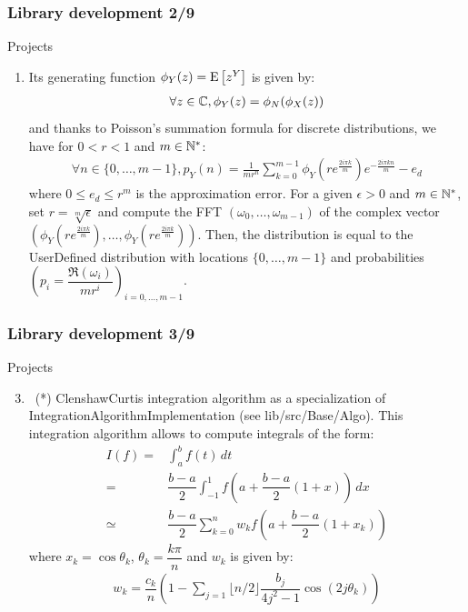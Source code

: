 \documentclass[8pt]{beamer}
\begin{document}
\begin{frame}
  \frametitle{Library development 2/9}
  \begin{block}{Projects}
    \begin{enumerate}
    \item[] Its generating function $\phi_Y(z)={\rm E}\left[ z^Y \right]$ is given by:
      \begin{align}
        \forall z\in{\mathbb C}, \phi_Y(z)=\phi_N(\phi_X(z))
      \end{align}
      and thanks to Poisson's summation formula for discrete distributions, we have for $0<r<1$ and $m\in{\mathbb N}^*$:
      \begin{eqnarray}\label{pnApprox}
        \forall n\in\{0,\dots, m-1\}, p_Y(n) = \displaystyle \frac{1}{mr^n} \sum_{k=0}^{m-1} \phi_Y\left(re^{\frac{2i\pi k}{m}}\right) e^{-\frac{2i\pi kn}{m}} - e_d
      \end{eqnarray}
      where $0\leq e_d\leq r^m$ is the approximation error. For a given $\epsilon>0$ and $m\in{\mathbb N}^*$, set $r=\sqrt[m]{\epsilon}$ and compute the FFT $(\omega_0,\dots,\omega_{m-1})$ of the complex vector $(\phi_Y\left(re^{\frac{2i\pi k}{m}}\right), \dots, \phi_Y\left(re^{\frac{2i\pi k}{m}}\right))$. Then, the distribution is equal to the {\ttfamily UserDefined} distribution with locations $\{0,\dots,m-1\}$ and probabilities $\left(p_i=\dfrac{\mathfrak{R}(\omega_i)}{mr^i}\right)_{i=0,\dots,m-1}$.
    \end{enumerate}
  \end{block}
\end{frame}

\begin{frame}
  \frametitle{Library development 3/9}
  \begin{block}{Projects}
    \begin{enumerate}
      \setcounter{enumi}{2}
    \item~(*) \alert{\ttfamily ClenshawCurtis} integration algorithm as a specialization of \alert{\ttfamily IntegrationAlgorithmImplementation} (see {\ttfamily lib/src/Base/Algo}). This integration algorithm allows to compute integrals of the form:
      \begin{align*}
        I(f)=&\int_a^bf(t)\,dt\\
        =&\dfrac{b-a}{2}\int_{-1}^1f\left(a+\dfrac{b-a}{2}(1+x)\right)\,dx\\
           \simeq& \dfrac{b-a}{2}\sum_{k=0}^nw_kf(a+\dfrac{b-a}{2}(1+x_k))
      \end{align*}
      where $x_k=\cos\theta_k$, $\theta_k=\dfrac{k\pi}{n}$ and $w_k$ is given by:
      \begin{align}
        w_k=\dfrac{c_k}{n}\left(1-\sum_{j=1}{\lfloor n/2\rfloor}\dfrac{b_j}{4j^2-1}\cos\left(2j\theta_k\right)\right)
      \end{align}
    \end{enumerate}
  \end{block}
\end{frame}
\end{document}
